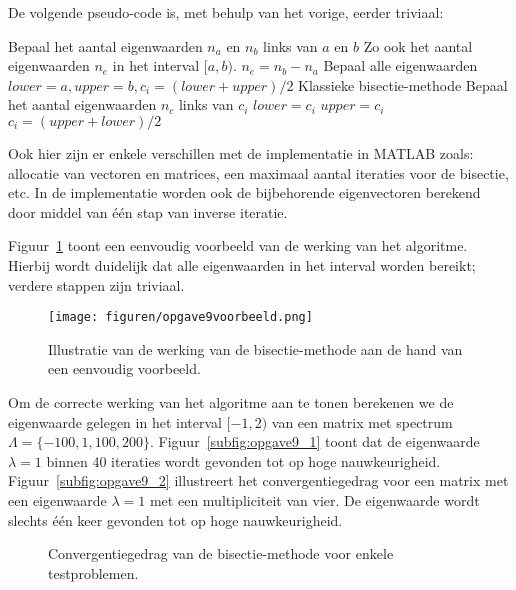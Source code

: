 \documentclass[a4paper, 12pt, titlepage]{report}
\begin{document}
De volgende pseudo-code is, met behulp van het vorige, eerder triviaal:\\

\begin{algorithmic}
\STATE Bepaal het aantal eigenwaarden $n_a$ en $n_b$ links van $a$ en $b$
\STATE Zo ook het aantal eigenwaarden $n_e$ in het interval $[a,b)$.
\STATE $n_e = n_b - n_a$
\STATE Bepaal alle eigenwaarden
\STATE $lower = a, upper = b, c_i = (lower+upper)/2$
\STATE Klassieke bisectie-methode
\STATE Bepaal het aantal eigenwaarden $n_c$ links van $c_i$
\STATE $lower = c_i$
\ELSE	
\STATE $upper = c_i$
\ENDIF
\STATE $c_i = (upper+lower)/2$
\ENDWHILE
\ENDFOR
\end{algorithmic}

Ook hier zijn er enkele verschillen met de implementatie in MATLAB zoals: allocatie van vectoren en matrices, een maximaal aantal iteraties voor de bisectie, etc. In de implementatie worden ook de bijbehorende eigenvectoren berekend door middel van \'e\'en stap van inverse iteratie.

Figuur~\ref{fig:opgave9voorbeeld} toont een eenvoudig voorbeeld van de werking van het algoritme. Hierbij wordt duidelijk dat alle eigenwaarden in het interval worden bereikt; verdere stappen zijn triviaal.

\begin{figure}[htb]
	\centering
	\texttt{[image: figuren/opgave9voorbeeld.png]}
	\caption{Illustratie van de werking van de bisectie-methode aan de hand van een eenvoudig voorbeeld.}
	\label{fig:opgave9voorbeeld}
\end{figure}

Om de correcte werking van het algoritme aan te tonen berekenen we de eigenwaarde gelegen in het interval $[-1,2)$ van een matrix met spectrum $\Lambda = \{ -100, 1, 100, 200\}$. Figuur~\ref{subfig:opgave9_1} toont dat de eigenwaarde $\lambda = 1$ binnen 40 iteraties wordt gevonden tot op hoge nauwkeurigheid. Figuur~\ref{subfig:opgave9_2} illustreert het convergentiegedrag voor een matrix met een eigenwaarde $\lambda = 1$ met een multipliciteit van vier. De eigenwaarde wordt slechts \'e\'en keer gevonden tot op hoge nauwkeurigheid.

\begin{figure}[htb]
\centering
\subfloat[Convergentiegedrag van de bisectie-methode voor het berekenen van de eigenwaarde gelegen in het interval $[-1,2)$ voor een matrix met spectrum $\Lambda = \{ -100, 1, 100, 200\}$.]{\label{subfig:opgave9_1}\texttt{[image: figuren/opgave9\_1.png]}}\hspace{1cm}
\subfloat[Convergentiegedrag van de bisectie-methode voor het berekenen van de eigenwaarde gelegen in het interval $[-1,2)$ voor een matrix met eigenwaarde $\lambda = 1$ met multipliciteit vier.]{\label{subfig:opgave9_2}\texttt{[image: figuren/opgave9\_2.png]}}
\caption{Convergentiegedrag van de bisectie-methode voor enkele testproblemen.}
\label{fig:opgave9}
\end{figure}
\end{document}
